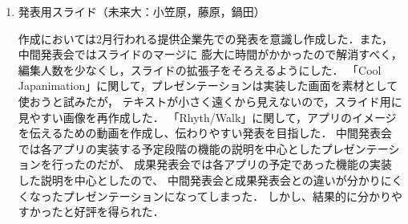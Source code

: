 \begin{enumerate}
\item 発表用スライド（未来大：小笠原，藤原，鍋田）
\par
作成においては2月行われる提供企業先での発表を意識し作成した．また，中間発表会ではスライドのマージに
膨大に時間がかかったので解消すべく，編集人数を少なくし，スライドの拡張子をそろえるようにした．
「Cool Japanimation」に関して，プレゼンテーションは実装した画面を素材として使おうと試みたが，
テキストが小さく遠くから見えないので，スライド用に見やすい画像を再作成した．
「Rhyth/Walk」に関して，アプリのイメージを伝えるための動画を作成し、伝わりやすい発表を目指した．
中間発表会では各アプリの実装する予定段階の機能の説明を中心としたプレゼンテーションを行ったのだが、
成果発表会では各アプリの予定であった機能の実装した説明を中心としたので、
中間発表会と成果発表会との違いが分かりにくくなったプレゼンテーションになってしまった．
しかし、結果的に分かりやすかったと好評を得られた．


\end{enumerate}
